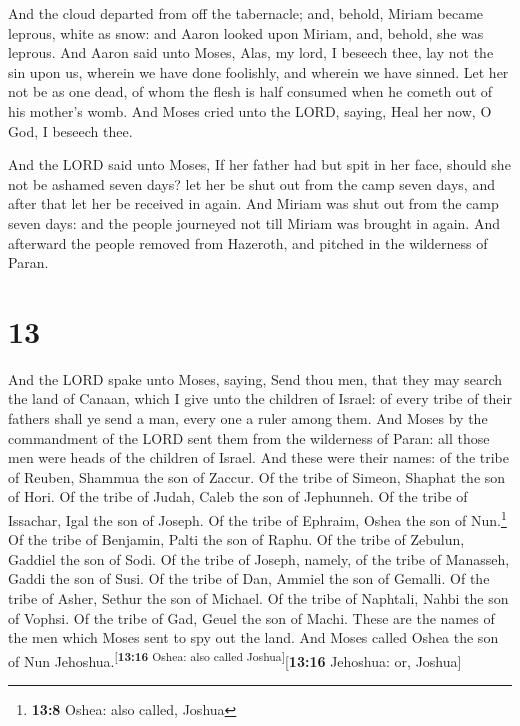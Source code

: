  And the cloud departed from off the tabernacle; and,
behold, Miriam became leprous, white as snow: and Aaron looked upon
Miriam, and, behold, she was leprous.  And Aaron said
unto Moses, Alas, my lord, I beseech thee, lay not the sin upon us,
wherein we have done foolishly, and wherein we have sinned.
 Let her not be as one dead, of whom the flesh is half
consumed when he cometh out of his mother's womb.  And
Moses cried unto the LORD, saying, Heal her now, O God, I beseech thee.

 And the LORD said unto Moses, If her father had but spit
in her face, should she not be ashamed seven days? let her be shut out
from the camp seven days, and after that let her be received in again.
 And Miriam was shut out from the camp seven days: and
the people journeyed not till Miriam was brought in again.
 And afterward the people removed from Hazeroth, and
pitched in the wilderness of Paran.

\hypertarget{section-12}{%
\section{13}\label{section-12}}

 And the LORD spake unto Moses, saying, 
Send thou men, that they may search the land of Canaan, which I give
unto the children of Israel: of every tribe of their fathers shall ye
send a man, every one a ruler among them.  And Moses by
the commandment of the LORD sent them from the wilderness of Paran: all
those men were heads of the children of Israel.  And these
were their names: of the tribe of Reuben, Shammua the son of Zaccur.
 Of the tribe of Simeon, Shaphat the son of Hori.
 Of the tribe of Judah, Caleb the son of Jephunneh.
 Of the tribe of Issachar, Igal the son of Joseph.
 Of the tribe of Ephraim, Oshea the son of Nun.\footnote{\textbf{13:8}
  Oshea: also called, Joshua}  Of the tribe of Benjamin,
Palti the son of Raphu.  Of the tribe of Zebulun, Gaddiel
the son of Sodi.  Of the tribe of Joseph, namely, of the
tribe of Manasseh, Gaddi the son of Susi.  Of the tribe
of Dan, Ammiel the son of Gemalli.  Of the tribe of
Asher, Sethur the son of Michael.  Of the tribe of
Naphtali, Nahbi the son of Vophsi.  Of the tribe of Gad,
Geuel the son of Machi.  These are the names of the men
which Moses sent to spy out the land. And Moses called Oshea the son of
Nun Jehoshua.\textsuperscript{{[}\textbf{13:16} Oshea: also called
Joshua{]}}{[}\textbf{13:16} Jehoshua: or, Joshua{]}

